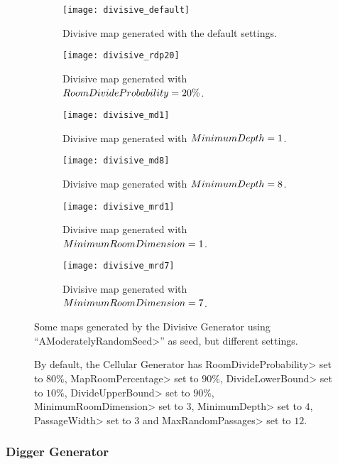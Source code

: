 \begin{figure}[tp]
	\centering
  	\begin{subfigure}[t]{0.325\linewidth}
		\texttt{[image: divisive\_default]}
     		\caption{Divisive map generated with the default settings.}
 	\end{subfigure}
  	\begin{subfigure}[t]{0.325\linewidth}
    		\texttt{[image: divisive\_rdp20]}
    		\caption{Divisive map generated with $Room\-Di\-vide\-Prob\-a\-bil\-i\-ty = 20\%$.}
  	\end{subfigure}
  	\begin{subfigure}[t]{0.325\linewidth}
    		\texttt{[image: divisive\_md1]}
    		\caption{Divisive map generated with $Min\-i\-mum\-Depth = 1$.}
  	\end{subfigure}
  	\begin{subfigure}[t]{0.325\linewidth}
		\texttt{[image: divisive\_md8]}
     		\caption{Divisive map generated with $Min\-i\-mum\-Depth= 8$.}
 	\end{subfigure}
  	\begin{subfigure}[t]{0.325\linewidth}
    		\texttt{[image: divisive\_mrd1]}
     		\caption{Divisive map generated with $Min\-i\-mum\-Room\-Di\-men\-sion = 1$.}
  	\end{subfigure}
  	\begin{subfigure}[t]{0.325\linewidth}
    		\texttt{[image: divisive\_mrd7]}
     		\caption{Divisive map generated with $Min\-i\-mum\-Room\-Di\-men\-sion = 7$.}
  	\end{subfigure}	
	\caption{Some maps generated by the Divisive Generator using ``\<AModeratelyRandomSeed>'' as seed, but different settings.}
	\caption*{By default, the Cellular Generator has \<Room\-Di\-vide\-Prob\-a\-bil\-i\-ty> set to $80\%$, \<Map\-Room\-Per\-cent\-age> set to $90\%$,  \<Di\-vide\-Low\-er\-Bound> set to $10\%$,  \<Di\-vide\-Up\-per\-Bound> set to $90\%$,  \<Min\-i\-mum\-Room\-Di\-men\-sion> set to $3$, \<Min\-i\-mum\-Depth> set to $4$, \<Pas\-sage\-Width> set to $3$ and \<Max\-Ran\-dom\-Pas\-sages> set to $12$.}
	\label{fig:divisives}
\end{figure}


\subsubsection{Digger Generator}

